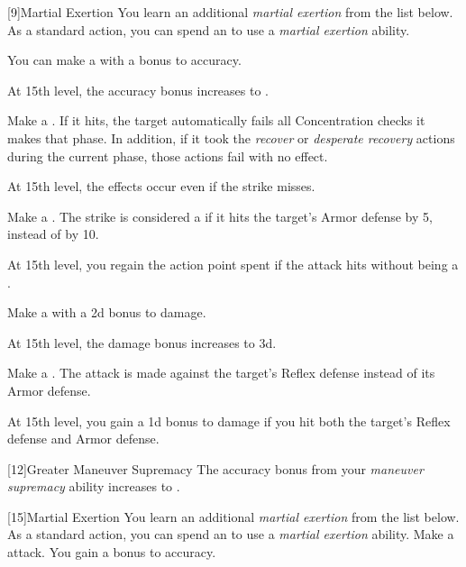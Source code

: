             [9]{Martial Exertion}
            You learn an additional \textit{martial exertion} from the list below.
            As a standard action, you can spend an  to use a \textit{martial exertion} ability.
            {
                 You can make a  with a  bonus to accuracy.

                At 15th level, the accuracy bonus increases to .

                 Make a .
                If it hits, the target automatically fails all Concentration checks it makes that phase.
                In addition, if it took the \textit{recover} or \textit{desperate recovery} actions during the current phase, those actions fail with no effect.

                At 15th level, the effects occur even if the strike misses.

                 Make a .
                The strike is considered a  if it hits the target's Armor defense by 5, instead of by 10.

                At 15th level, you regain the action point spent if the attack hits without being a .

                 Make a  with a \plus2d bonus to damage.

                At 15th level, the damage bonus increases to \plus3d.

                 Make a .
                The attack is made against the target's Reflex defense instead of its Armor defense.

                At 15th level, you gain a \plus1d bonus to damage if you hit both the target's Reflex defense and Armor defense.
            }

            [12]{Greater Maneuver Supremacy} The accuracy bonus from your \textit{maneuver supremacy} ability increases to .

            [15]{Martial Exertion} 
            You learn an additional \textit{martial exertion} from the list below.
            As a standard action, you can spend an  to use a \textit{martial exertion} ability.
            {
                 Make a  attack.
                You gain a  bonus to accuracy.
            }

